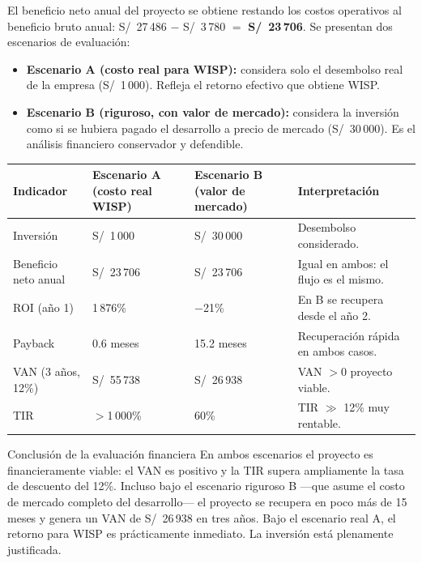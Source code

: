 El beneficio neto anual del proyecto se obtiene restando los costos operativos al
beneficio bruto anual: S/~27\,486 $-$ S/~3\,780 $=$ \textbf{S/~23\,706}. Se presentan
dos escenarios de evaluación:

\begin{itemize}[leftmargin=1.4em]
  \item \textbf{Escenario A (costo real para WISP):} considera solo el desembolso real
  de la empresa (S/~1\,000). Refleja el retorno efectivo que obtiene WISP.
  \item \textbf{Escenario B (riguroso, con valor de mercado):} considera la inversión
  como si se hubiera pagado el desarrollo a precio de mercado (S/~30\,000). Es el
  análisis financiero conservador y defendible.
\end{itemize}

\begin{center}
\label{tab:financiero}
\begin{tabularx}{\textwidth}{L{2.8cm} C{2.3cm} C{2.5cm} X}
\toprule
\textbf{Indicador} & \textbf{Escenario A (costo real WISP)} &
\textbf{Escenario B (valor de mercado)} & \textbf{Interpretación} \\
\midrule
Inversión & S/~1\,000 & S/~30\,000 & Desembolso considerado. \\
Beneficio neto anual & S/~23\,706 & S/~23\,706 & Igual en ambos: el flujo es el mismo. \\
ROI (año 1) & 1\,876\% & $-$21\% & En B se recupera desde el año 2. \\
Payback & 0.6 meses & 15.2 meses & Recuperación rápida en ambos casos. \\
VAN (3 años, 12\%) & S/~55\,738 & S/~26\,938 & VAN $>0$ \textrightarrow{} proyecto viable. \\
TIR & $>$1\,000\% & 60\% & TIR $\gg$ 12\% \textrightarrow{} muy rentable. \\
\bottomrule
\end{tabularx}
\end{center}

\begin{upeubox}{Conclusión de la evaluación financiera}
En ambos escenarios el proyecto es financieramente viable: el VAN es positivo y la
TIR supera ampliamente la tasa de descuento del 12\%. Incluso bajo el escenario
riguroso B ---que asume el costo de mercado completo del desarrollo--- el proyecto se
recupera en poco más de 15 meses y genera un VAN de S/~26\,938 en tres años. Bajo el
escenario real A, el retorno para WISP es prácticamente inmediato. La inversión está
plenamente justificada.
\end{upeubox}

